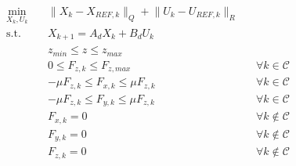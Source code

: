\documentclass{article}
\begin{document}
\begin{align}
\min_{X_k,U_k} \quad & \lVert X_k - X_{REF, k} \lVert_Q + \lVert U_k - U_{REF,  k} \lVert_R \\
\textrm{s.t.} \quad & X_{k+1} = A_d X_k + B_d U_k \\
  & z_{min} \leq {z} \leq z_{max} \\  
  & 0 \leq {F_{z, k}} \leq F_{z, max} && \forall k \in \mathcal{C}  \\
  & -\mu {F_{z, k}} \leq F_{x, k} \leq \mu {F_{z, k}} && \forall k \in \mathcal{C}  \\
  & -\mu {F_{z, k}} \leq F_{y, k} \leq \mu {F_{z, k}} && \forall k \in \mathcal{C}  \\   
  & F_{x, k} = 0 && \forall k \notin \mathcal{C}  \\   
  & F_{y, k} = 0 && \forall k \notin \mathcal{C}  \\    
  & F_{z, k} = 0 && \forall k \notin \mathcal{C}  \\     
\end{align}

    
\end{document}

